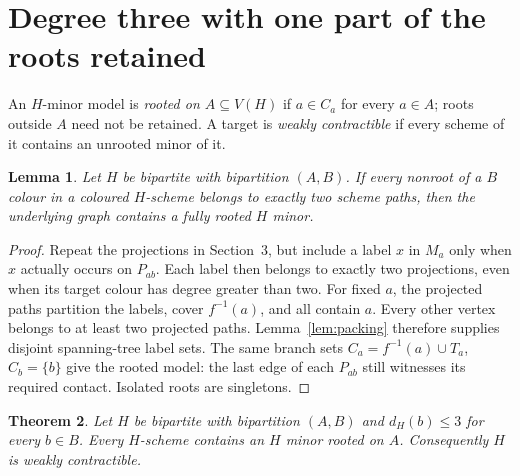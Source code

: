 \documentclass[11pt]{amsart}
\newtheorem{theorem}{Theorem}[section]
\newtheorem{lemma}[theorem]{Lemma}
\begin{document}
\section{Degree three with one part of the roots retained}

An $H$-minor model is \emph{rooted on $A\subseteq V(H)$} if $a\in C_a$
for every $a\in A$; roots outside $A$ need not be retained. A target is
\emph{weakly contractible} if every scheme of it contains an unrooted
minor of it.

\begin{lemma}\label{lem:memberships}
Let $H$ be bipartite with bipartition $(A,B)$. If every nonroot of a
$B$ colour in a coloured $H$-scheme belongs to exactly two scheme paths,
then the underlying graph contains a fully rooted $H$ minor.
\end{lemma}

\begin{proof}
Repeat the projections in Section~3, but include a label $x$ in $M_a$
only when $x$ actually occurs on $P_{ab}$. Each label then belongs to
exactly two projections, even when its target colour has degree greater
than two. For fixed $a$, the projected paths partition the labels, cover
$f^{-1}(a)$, and all contain $a$. Every other vertex belongs to at least
two projected paths. Lemma~\ref{lem:packing} therefore supplies disjoint
spanning-tree label sets. The same branch sets $C_a=f^{-1}(a)\cup T_a$,
$C_b=\{b\}$ give the rooted model: the last edge of each $P_{ab}$ still
witnesses its required contact. Isolated roots are singletons.
\end{proof}

\begin{theorem}\label{thm:degree-three}
Let $H$ be bipartite with bipartition $(A,B)$ and $d_H(b)\leq3$ for every
$b\in B$. Every $H$-scheme contains an $H$ minor rooted on $A$.
Consequently $H$ is weakly contractible.
\end{theorem}
\end{document}
